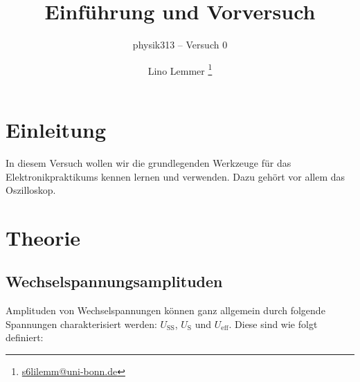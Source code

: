 




\subject{Praktikumsprotokoll}
\title{Einführung und Vorversuch}
\subtitle{physik313 – Versuch 0}
\author{
	Lino Lemmer \footnote{\href{mailto:s6lilemm@uni-bonn.de}{s6lilemm@uni-bonn.de}}
}
\publishers{Gruppe 3 -- A -- Brezina}



\maketitle

\tableofcontents
\newpage


\section{Einleitung}

In diesem Versuch wollen wir die grundlegenden Werkzeuge für das
Elektronikpraktikums kennen lernen und verwenden. Dazu gehört vor allem das
Oszilloskop.


\section{Theorie}

\subsection{Wechselspannungsamplituden}

Amplituden von Wechselspannungen können ganz allgemein durch folgende
Spannungen charakterisiert werden: $U_\text{SS}$, $U_\text{S}$ und
$U_\text{eff}$. Diese sind wie folgt definiert:

